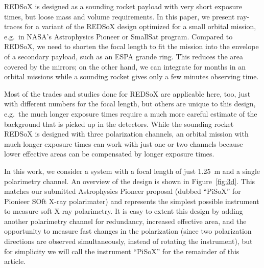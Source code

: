 \documentclass[]{spie}  %
\begin{document}
REDSoX is designed as a sounding rocket payload with very short
exposure times, but loose mass and volume requirements. In this paper,
we present ray-traces for a variant of the REDSoX design optimized for
a small orbital mission, e.g.\ in NASA's Astrophysics Pioneer or
SmallSat program. Compared to REDSoX, we need to shorten the focal
length to fit the mission into the envelope of a secondary payload,
such as an ESPA grande ring. This reduces the area covered by the
mirrors; on the other hand, we can integrate for months in an orbital
missions while a sounding rocket gives only a few minutes observing
time.

Most of the trades and studies done for REDSoX\cite{redsoxtrace} are
applicable here, too, just with different numbers for the focal
length, but others are unique to this design, e.g.\ the much longer
exposure times require a much more careful estimate of the background
that is picked up in the detectors.  While the sounding rocket REDSoX
is designed with three polarization channels, an orbital mission with
much longer exposure times can work with just one or two channels
because lower effective areas can be compensated by longer exposure
times.

In this work, we consider a system with a focal length of just 1.25~m
and a single polarimetry channel. An overview of the design is shown
in Figure~\ref{fig:3d}. This matches our submitted Astrophysics
Pioneer proposal (dubbed ``PiSoX'' for Pionieer SOft X-ray
polarimater) and represents the simplest possible instrument to
measure soft X-ray polarimetry. It is easy to extent this design by
adding another polarimetry channel for redundancy, increased effective
area, and the opportunity to measure fast changes in the polarization
(since two polarization directions are observed simultaneously,
instead of rotating the instrument), but for simplicity we will call
the instrument ``PiSoX'' for the remainder of this article.
\end{document}
